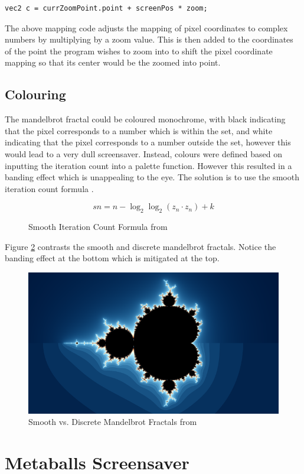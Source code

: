 \documentclass[10pt, openany]{book}
\begin{document}
\begin{verbatim}
vec2 c = currZoomPoint.point + screenPos * zoom;
\end{verbatim}

The above mapping code adjusts the mapping of pixel coordinates to complex numbers by multiplying by a zoom value. This is then added to the coordinates of the point the program wishes to zoom into to shift the pixel coordinate mapping so that its center would be the zoomed into point.

\subsection{Colouring}

The mandelbrot fractal could be coloured monochrome, with black indicating that the pixel corresponds to a number which is within the set, and white indicating that the pixel corresponds to a number outside the set, however this would lead to a very dull screensaver. Instead, colours were defined based on inputting the iteration count into a palette function. However this resulted in a banding effect which is unappealing to the eye. The solution is to use the smooth iteration count formula \citep{quilez-smooth}.

\begin{figure}[H]
	\centering
	\[ sn = n - \log_2\log_2(z_n \cdot z_n) + k \]
	\caption{Smooth Iteration Count Formula from \citep{quilez-smooth}}
	\label{fig:smooth-iter}
\end{figure}

Figure \ref{fig:smooth-mandel} contrasts the smooth and discrete mandelbrot fractals. Notice the banding effect at the bottom which is mitigated at the top.

\begin{figure}[H]
	\centering
	\includegraphics[width=0.4\linewidth]{SmoothMandelbrot}
	\caption{Smooth vs. Discrete Mandelbrot Fractals from \citep{quilez-smooth}}
	\label{fig:smooth-mandel}
\end{figure}

\section{Metaballs Screensaver}
\end{document}
